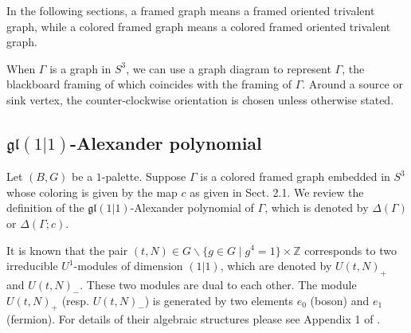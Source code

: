 \documentclass[12pt]{amsart}
\newtheorem{defn}[theo]{Definition}
\def\Ptwist{\unitlength.1em
  \begin{minipage}{15\unitlength}
    \begin{picture}(15,15)
     \put(0,7.5){\line(1,0){6}}
     \put(9,7.5){\line(1,0){6}}
      \put(4,9.5){\line(1,0){3}}
      \qbezier(7,9.5)(7,9.5)(9,5.5)
      \put(9, 5.5){\line(1,0){3}}
    \end{picture}
  \end{minipage}
}
\def\Ntwist{\unitlength.1em
  \begin{minipage}{15\unitlength}
    \begin{picture}(15,15)
     \put(0,7.5){\line(1,0){6}}
     \put(9,7.5){\line(1,0){6}}
      \put(4,5.5){\line(1,0){3}}
      \qbezier(7,5.5)(7,5.5)(9,9.5)
      \put(9, 9.5){\line(1,0){3}}
    \end{picture}
  \end{minipage}
}
\begin{document}
In the following sections, a framed graph means a framed oriented trivalent graph, while a colored framed graph means a colored framed oriented trivalent graph.

When $\Gamma$ is a graph in $S^3$, we can use a graph diagram to represent $\Gamma$, the blackboard framing of which coincides with the framing of $\Gamma$. Around a source or sink vertex, the counter-clockwise orientation is chosen unless otherwise stated.





\subsection{$\mathfrak{gl}(1\vert 1)$-Alexander polynomial}

Let $(B, G)$ be a $1$-palette. 
Suppose $\Gamma$ is a colored framed graph embedded in $S^3$ whose coloring is given by the map $c$ as given in Sect. 2.1. We review the definition of the $\mathfrak{gl}(1\vert 1)$-Alexander polynomial of $\Gamma$, which is denoted by $\Delta(\Gamma)$ or $\Delta(\Gamma; c)$. 

It is known that the pair $(t, N)\in G\backslash \{g\in G \mid g^4=1\}\times \mathbb{Z}$ corresponds to two irreducible $U^1$-modules of dimension $(1 \vert 1)$, which are denoted by $U(t, N)_{+}$ and $U(t, N)_{-}$. These two modules are dual to each other. The module $U(t, N)_{+}$ (resp. $U(t, N)_{-}$) is generated by two elements $e_0$ (boson) and $e_1$ (fermion). For details of their algebraic structures please see Appendix 1 of \cite{MR2255851}. 
\end{document}

